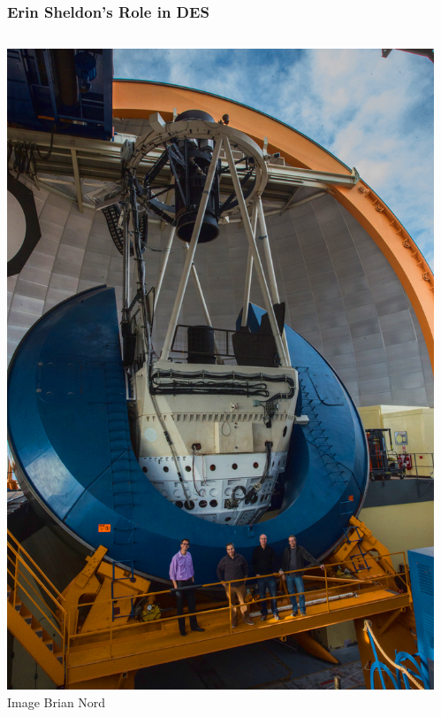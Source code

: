 \documentclass[aspectratio=169]{beamer}
\begin{document}
%
\frame
{

    \frametitle{Erin Sheldon's Role in DES}


    \begin{columns}
        \begin{column}{0.5\textwidth}
            \centering
                \includegraphics[height=0.8\textheight]{ctio_blanco_crew_2013Oct-30-small-balance.jpg}
                \newline
                {\tiny Image Brian Nord}
        \end{column}

        \begin{column}{0.5\textwidth}
            \begin{itemize}


\end{itemize}
\end{column}
\end{columns}}
\end{document}
